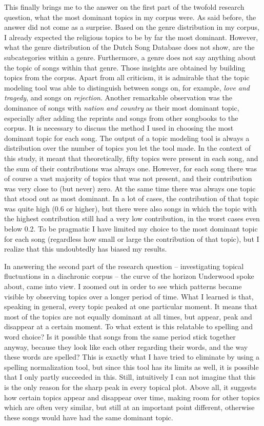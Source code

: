 This finally brings me to the answer on the first part of the twofold research question, what the most dominant topics in my corpus were. As said before, the answer did not come as a surprise. Based on the genre distribution in my corpus, I already expected the religious topics to be by far the most dominant. However, what the genre distribution of the Dutch Song Database does not show, are the subcategories within a genre. Furthermore, a genre does not say anything about the topic of songs within that genre. Those insights are obtained by building topics from the corpus. Apart from all criticism, it is admirable that the topic modeling tool was able to distinguish between songs on, for example, \textit{love and tragedy}, and songs on \textit{rejection}. Another remarkable observation was the dominance of songs with \textit{nation and country} as their most dominant topic, especially after adding the reprints and songs from other songbooks to the corpus. It is necessary to discuss the method I used in choosing the most dominant topic for each song. The output of a topic modeling tool is always a distribution over the number of topics you let the tool made. In the context of this study, it meant that theoretically, fifty topics were present in each song, and the sum of their contributions was always one. However, for each song there was of course a vast majority of topics that was not present, and their contribution was very close to (but never) zero. At the same time there was always one topic that stood out as most dominant. In a lot of cases, the contribution of that topic was quite high (0.6 or higher), but there were also songs in which the topic with the highest contribution still had a very low contribution, in the worst cases even below 0.2. To be pragmatic I have limited my choice to the most dominant topic for each song (regardless how small or large the contribution of that topic), but I realize that this undoubtedly has biased my results.

In answering the second part of the research question -- investigating topical fluctuations in a diachronic corpus -- the curve of the horizon Underwood spoke about, came into view. I zoomed out in order to see which patterns became visible by observing topics over a longer period of time. What I learned is that, speaking in general, every topic peaked at one particular moment. It means that most of the topics are not equally dominant at all times, but appear, peak and disappear at a certain moment. To what extent is this relatable to spelling and word choice? Is it possible that songs from the same period stick together anyway, because they look like each other regarding their words, and the way these words are spelled? This is exactly what I have tried to eliminate by using a spelling normalization tool, but since this tool has its limits as well, it is possible that I only partly succeeded in this. Still, intuitively I can not imagine that this is the only reason for the sharp peak in every topical plot. Above all, it suggests how certain topics appear and disappear over time, making room for other topics which are often very similar, but still at an important point different, otherwise these songs would have had the same dominant topic.

